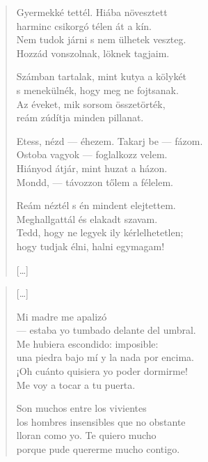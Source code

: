 \documentclass[11pt]{book}
\newcommand*{\centeredornament}{\centerline{\pgfornament[width=6cm]{88}}}
\begin{document}
\begin{verse}
  Gyermekké tettél. Hiába növesztett \\
  harminc csikorgó télen át a kín. \\
  Nem tudok járni s nem ülhetek veszteg. \\
  Hozzád vonszolnak, löknek tagjaim.

  Számban tartalak, mint kutya a kölykét \\
  s menekülnék, hogy meg ne fojtsanak. \\
  Az éveket, mik sorsom összetörték, \\
  reám zúdítja minden pillanat.

  Etess, nézd --- éhezem. Takarj be --- fázom. \\
  Ostoba vagyok --- foglalkozz velem. \\
  Hiányod átjár, mint huzat a házon. \\
  Mondd, --- távozzon tőlem a félelem.

  Reám néztél s én mindent elejtettem. \\
  Meghallgattál és elakadt szavam. \\
  Tedd, hogy ne legyek ily kérlelhetetlen; \\
  hogy tudjak élni, halni egymagam!

  \hfill [\ldots]
\end{verse}

\newpage

\vspace*{-15mm}
\centeredornament


\poemtitle*{\phantom{Me convertiste en un niño}}

\begin{verse}
  \textnormal{[\ldots]}

  Mi madre me apalizó \\
  --- estaba yo tumbado delante del umbral. \\
  Me hubiera escondido: imposible: \\
  una piedra bajo mí y la nada por encima. \\
  ¡Oh cuánto quisiera yo poder dormirme! \\
  Me voy a tocar a tu puerta.

  Son muchos entre los vivientes \\
  los hombres insensibles que no obstante \\
  lloran como yo. Te quiero mucho \\
  porque pude quererme mucho contigo.
\end{verse}
\end{document}
